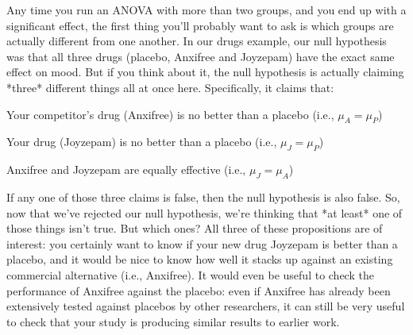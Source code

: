 



%
%


Any time you run an ANOVA with more than two groups, and you end up with a significant effect, the first thing you'll probably want to ask is which groups are actually different from one another. In our drugs example, our null hypothesis was that all three drugs (placebo, Anxifree and Joyzepam) have the exact same effect on mood. But if you think about it, the null hypothesis is actually claiming *three* different things all at once here. Specifically, it claims that:
 \itemsep 0pt
\item Your competitor's drug (Anxifree) is no better than a placebo (i.e., $\mu_A = \mu_P$)
\item Your drug (Joyzepam) is no better than a placebo (i.e., $\mu_J = \mu_P$)
\item Anxifree and Joyzepam are equally effective (i.e., $\mu_J = \mu_A$)

If any one of those three claims is false, then the null hypothesis is also false. So, now that we've rejected our null hypothesis, we're thinking that *at least* one of those things isn't true. But which ones? All three of these propositions are of interest: you certainly want to know if your new drug Joyzepam is better than a placebo, and it would be nice to know how well it stacks up against an existing commercial alternative (i.e., Anxifree). It would even be useful to check the performance of Anxifree against the placebo: even if Anxifree has already been extensively tested against placebos by other researchers, it can still be very useful to check that your study is producing similar results to earlier work.

